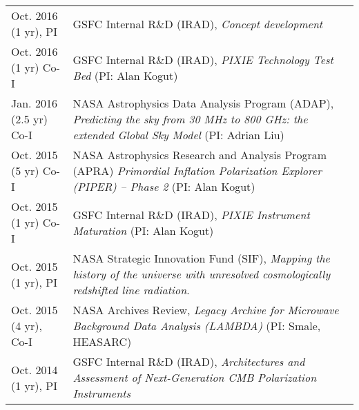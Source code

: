 {\begin{tabular}{l p{12cm}}
Oct. 2016 (1 yr), PI & GSFC Internal R\&D (IRAD), {\em Concept development} \\
Oct. 2016 (1 yr) Co-I & GSFC Internal R\&D (IRAD), {\em PIXIE Technology Test Bed} (PI: Alan Kogut) \\
Jan. 2016 (2.5 yr) Co-I & NASA Astrophysics Data Analysis Program (ADAP), {\em Predicting the sky from 30 MHz to 800 GHz: the extended Global Sky Model} (PI: Adrian Liu) \\
Oct. 2015 (5 yr) Co-I & NASA Astrophysics Research and Analysis Program (APRA) {\em Primordial Inflation Polarization Explorer (PIPER) -- Phase 2} (PI: Alan Kogut) \\
Oct. 2015 (1 yr) Co-I & GSFC Internal R\&D (IRAD), {\em PIXIE Instrument Maturation} (PI: Alan Kogut) \\
Oct. 2015 (1 yr), PI & NASA Strategic Innovation Fund (SIF), {\em Mapping the history of the universe with unresolved cosmologically redshifted line radiation}. \\
Oct. 2015 (4 yr), Co-I & NASA Archives Review, {\em Legacy Archive for Microwave Background Data Analysis (LAMBDA)} (PI: Smale, HEASARC)\\
Oct. 2014 (1 yr), PI & GSFC Internal R\&D (IRAD), {\em Architectures and Assessment of Next-Generation CMB Polarization Instruments} \\

\end{tabular}}
